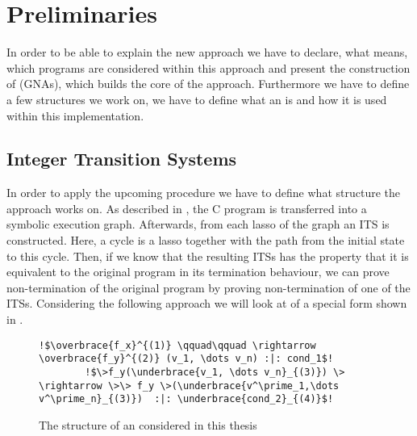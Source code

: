 \chapter{Preliminaries}
\label{chapter:preliminaries}

In order to be able to explain the new \nonterm approach we have to declare, what \nonterm means, which programs are considered within this approach and present the construction of \gnas (GNAs), which builds the core of the approach. Furthermore we have to define a few structures we work on, we have to define what an \solver is and how it is used within this implementation.


\section{Integer Transition Systems}
\label{sec:its}
In order to apply the upcoming procedure we have to define what structure the approach works on. As described in , the C program is transferred into a symbolic execution graph. Afterwards, from each lasso of the graph an ITS is constructed. Here, a cycle is a lasso together with the path from the initial state to this cycle. Then, if we know that the resulting ITSs has the property that it is equivalent to the original program in its termination behaviour, we can prove non-termination of the original program by proving non-termination of one of the ITSs. Considering the following approach we will look at \itss of a special form shown in .\newline
\begin{figure}[H]
	\begin{lstlisting}[escapechar=!]
		!$\overbrace{f_x}^{(1)} \qquad\qquad \rightarrow \overbrace{f_y}^{(2)} (v_1, \dots v_n) :|: cond_1$!
		!$\>f_y(\underbrace{v_1, \dots v_n}_{(3)}) \> \rightarrow \>\> f_y \>(\underbrace{v^\prime_1,\dots v^\prime_n}_{(3)})  :|: \underbrace{cond_2}_{(4)}$!
	\end{lstlisting}
	\caption{The structure of an \its considered in this thesis}
	\label{fig:its-structure}
\end{figure}

